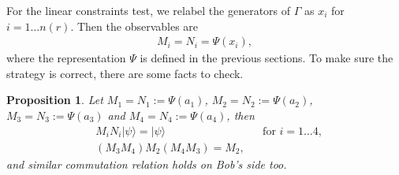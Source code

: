\documentclass[11pt,letterpaper]{article}
\newcommand{\ket}[1]{|#1\rangle}
\newcommand{\1}{\mathbb{1}}
\newcommand{\nr}{n(r)}
\newtheorem{proposition}[theorem]{Proposition}
\theoremstyle{definition}
\begin{document}
For the linear constraints test, we relabel the generators of $\Gamma$ as $x_i$ for $i = 1 \dots \nr$. Then the 
observables are
\begin{align}
	M_i = N_i = \Psi(x_i),
\end{align}
where the representation $\Psi$ is defined in the previous sections.
To make sure the strategy is correct, there are some facts to check.
\begin{proposition}
Let $M_1 = N_1 :=\Psi(a_1)$, $M_2 = N_2 := \Psi(a_2)$, $M_3 = N_3 := \Psi(a_3)$
and $M_4 = N_4 := \Psi(a_4)$, then
\begin{align}
	&M_i N_i \ket{\psi} = \ket{\psi} && \text{for } i = 1 \dots 4,\\
	&(M_3M_4)M_2(M_4M_3) = M_2,
\end{align}
and similar commutation relation holds on Bob's side too.
\end{proposition}
\end{document}
